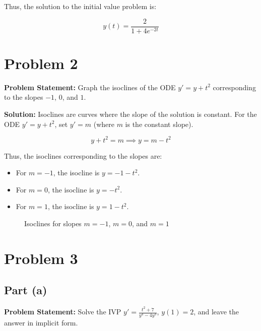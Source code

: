 \documentclass[12pt, letterpaper]{article}
\begin{document}
Thus, the solution to the initial value problem is:

\[
y(t) = \frac{2}{1 + 4e^{-2t}}
\]

\section*{Problem 2}

\textbf{Problem Statement:} Graph the isoclines of the ODE \( y' = y + t^2 \) corresponding to the slopes \(-1\), \(0\), and \(1\).

\textbf{Solution:}
Isoclines are curves where the slope of the solution is constant. For the ODE \( y' = y + t^2 \), set \( y' = m \) (where \( m \) is the constant slope).

\[
y + t^2 = m \implies y = m - t^2
\]

Thus, the isoclines corresponding to the slopes are:
\begin{itemize}
    \item For \( m = -1 \), the isocline is \( y = -1 - t^2 \).
    \item For \( m = 0 \), the isocline is \( y = -t^2 \).
    \item For \( m = 1 \), the isocline is \( y = 1 - t^2 \).
\end{itemize}

\begin{figure}[H]
    \centering
    \caption{Isoclines for slopes $m = -1$, $m = 0$, and $m = 1$}
\end{figure}

\section*{Problem 3}

\subsection*{Part (a)}
\textbf{Problem Statement:} Solve the IVP \( y' = \frac{t^2 + 7}{y^4 - 4y^3} \), \( y(1) = 2 \), and leave the answer in implicit form.
\end{document}
